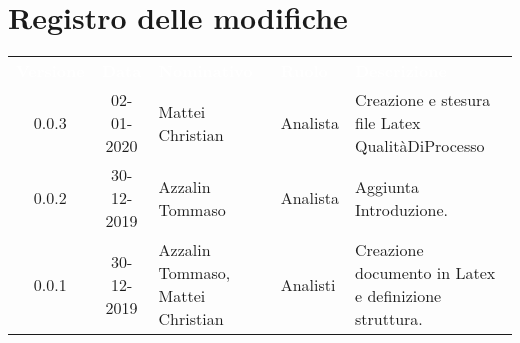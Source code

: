 \section*{Registro delle modifiche}
{
\renewcommand{\arraystretch}{1.5}
\centering
\begin{longtable}{ c c  C{4cm}  C{3cm} C{4cm}}
\textcolor{white}{\textbf{Versione}} & \textcolor{white}{\textbf{Data}} & \textcolor{white}{\textbf{Nominativo}} & \textcolor{white}{\textbf{Ruolo}} & \textcolor{white}{\textbf{Descrizione}}\\	

0.0.3 & 02-01-2020 & Mattei Christian & Analista & Creazione e stesura file Latex QualitàDiProcesso \\
0.0.2 & 30-12-2019 & Azzalin Tommaso & Analista & Aggiunta Introduzione. \\
0.0.1 & 30-12-2019 & Azzalin Tommaso, Mattei Christian & Analisti & Creazione documento in Latex e definizione struttura.  \\	
		
\end{longtable}
}